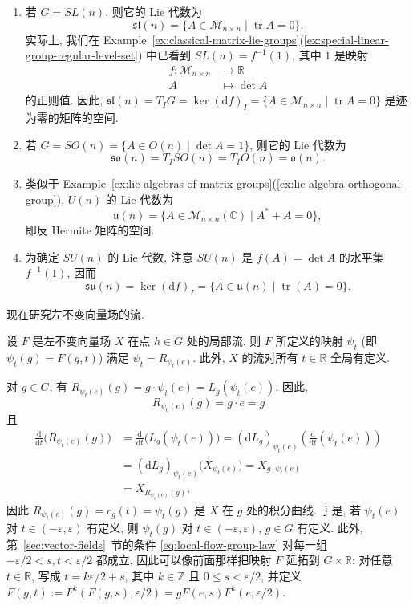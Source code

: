 \begin{RiemannExample}
\begin{enumerate}[label=(\arabic*),ref=\arabic*,leftmargin=*]
\item 若 $G=SL(n)$, 则它的 Lie 代数为
\[
  \mathfrak{sl}(n)=\{A\in\mathcal M_{n\times n}\mid\operatorname{tr}A=0\}.
\]
实际上, 我们在 Example~\ref{ex:classical-matrix-lie-groups}(\ref{ex:special-linear-group-regular-level-set}) 中已看到 $SL(n)=f^{-1}(1)$, 其中 $1$ 是映射
\begin{align*}
  f:\mathcal M_{n\times n}&\to\mathbb{R}\\ A&\mapsto\det A
\end{align*}
的正则值. 因此, $\mathfrak{sl}(n)=T_IG=\ker(\mathrm{d}f)_I=\{A\in\mathcal M_{n\times n}\mid\operatorname{tr}A=0\}$ 是迹为零的矩阵的空间.
\item 若 $G=SO(n)=\{A\in O(n)\mid\det A=1\}$, 则它的 Lie 代数为
\[
  \mathfrak{so}(n)=T_I SO(n)=T_I O(n)=\mathfrak o(n).
\]
\item 类似于 Example~\ref{ex:lie-algebras-of-matrix-groups}(\ref{ex:lie-algebra-orthogonal-group}), $U(n)$ 的 Lie 代数为
\[
  \mathfrak u(n)=\{A\in\mathcal M_{n\times n}(\mathbb{C})\mid A^*+A=0\},
\]
即反 Hermite 矩阵的空间.
\item 为确定 $SU(n)$ 的 Lie 代数, 注意 $SU(n)$ 是 $f(A)=\det A$ 的水平集 $f^{-1}(1)$, 因而
\[
  \mathfrak{su}(n)=\ker(\mathrm{d}f)_I
  =\{A\in\mathfrak u(n)\mid\operatorname{tr}(A)=0\}.
\]
\end{enumerate}
\end{RiemannExample}

现在研究左不变向量场的流.

\begin{RiemannProposition}\label{prop:global-flow-of-left-invariant-vector-field}
设 $F$ 是左不变向量场 $X$ 在点 $h\in G$ 处的局部流. 则 $F$ 所定义的映射 $\psi_t$ (即 $\psi_t(g)=F(g,t)$) 满足 $\psi_t=R_{\psi_t(e)}$. 此外, $X$ 的流对所有 $t\in\mathbb{R}$ 全局有定义.
\end{RiemannProposition}

\begin{RiemannProof}
对 $g\in G$, 有 $R_{\psi_t(e)}(g)=g\cdot\psi_t(e)=L_g(\psi_t(e))$. 因此,
\[
  R_{\psi_0(e)}(g)=g\cdot e=g
\]
且
\begin{align*}
  \frac{\mathrm{d}}{\mathrm{d}t}\bigl(R_{\psi_t(e)}(g)\bigr)
    &=\frac{\mathrm{d}}{\mathrm{d}t}\bigl(L_g(\psi_t(e))\bigr)
      =(\mathrm{d}L_g)_{\psi_t(e)}\left(\frac{\mathrm{d}}{\mathrm{d}t}(\psi_t(e))\right)\\
    &=(\mathrm{d}L_g)_{\psi_t(e)}\bigl(X_{\psi_t(e)}\bigr)=X_{g\cdot\psi_t(e)}\\
    &=X_{R_{\psi_t(e)}(g)},
\end{align*}
因此 $R_{\psi_t(e)}(g)=c_g(t)=\psi_t(g)$ 是 $X$ 在 $g$ 处的积分曲线. 于是, 若 $\psi_t(e)$ 对 $t\in(-\varepsilon,\varepsilon)$ 有定义, 则 $\psi_t(g)$ 对 $t\in(-\varepsilon,\varepsilon)$, $g\in G$ 有定义. 此外, 第~\ref{sec:vector-fields}~节的条件 \eqref{eq:local-flow-group-law} 对每一组 $-\varepsilon/2<s,t<\varepsilon/2$ 都成立, 因此可以像前面那样把映射 $F$ 延拓到 $G\times\mathbb{R}$: 对任意 $t\in\mathbb{R}$, 写成 $t=k\varepsilon/2+s$, 其中 $k\in\mathbb{Z}$ 且 $0\leq s<\varepsilon/2$, 并定义 $F(g,t):=F^k(F(g,s),\varepsilon/2)=gF(e,s)F^k(e,\varepsilon/2)$.
\end{RiemannProof}

